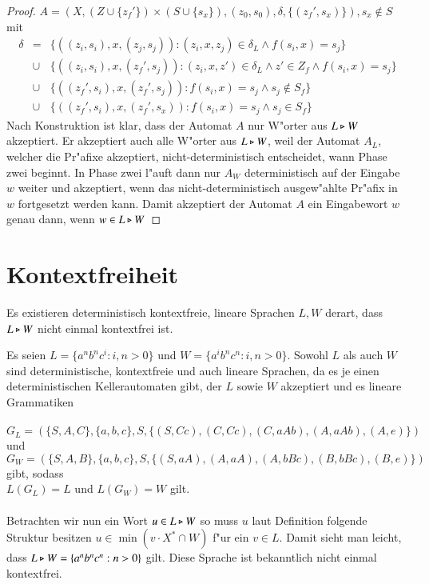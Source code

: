 \begin{proof}
$A = (X,(Z\cup \{ z_f'\})\times (S\cup \{ s_x\}), (z_{0},s_{0}), \delta , \{ (z_f',s_x) \} ), s_x\notin S$
mit\\
\setcounter{equation}{0}
\begin{eqnarray}
 \delta &=&\{ ((z_i,s_i),x,(z_j,s_j)) : (z_i,x,z_j) \in \delta_L \wedge f(s_i,x)=s_j  \}  \label{auto1} \\
 & \cup & \{ ((z_i,s_i),x,(z_f',s_j)) : (z_i,x,z') \in \delta_L \wedge z'\in Z_f \wedge f(s_i,x)=s_j  \} \label{auto2}\\
 & \cup & \{ ((z_f',s_i),x,(z_f',s_j)) : f(s_i,x)=s_j  \wedge s_j \notin S_f\} \label{auto3}\\
 & \cup & \{ ((z_f',s_i),x,(z_f',s_x)) : f(s_i,x)=s_j  \wedge s_j \in S_f \label{auto4} \}
\end{eqnarray}
Nach Konstruktion ist klar, dass der Automat $A$ nur W"orter aus $L\triangleright W$ akzeptiert. Er akzeptiert auch alle W"orter aus $L\triangleright W$, weil der Automat $A_L$, welcher die Pr"afixe akzeptiert, nicht-deterministisch entscheidet, wann Phase zwei beginnt. In Phase zwei l"auft dann nur $A_W$ deterministisch auf der Eingabe $w$ weiter und akzeptiert, wenn das nicht-deterministisch ausgew"ahlte Pr"afix in $w$ fortgesetzt werden kann.
Damit akzeptiert der Automat $A$ ein Eingabewort $w$ genau dann, wenn $w\in L\triangleright W$
\end{proof}

\section{Kontextfreiheit}
Es existieren deterministisch kontextfreie, lineare Sprachen $L,W$ derart, dass $L\triangleright W$ nicht einmal kontextfrei ist.
\begin{beispiel}
Es seien $L=\{a^nb^nc^i:i,n>0\}$ und $W=\{a^ib^nc^n:i,n>0\}$. Sowohl $L$ als auch $W$ sind deterministische, kontextfreie und auch lineare Sprachen, da es je einen deterministischen Kellerautomaten gibt, der $L$ sowie $W$ akzeptiert und es lineare Grammatiken \\\\$G_L = (\{S,A,C\},\{a,b,c\},S,\{ (S,Cc),(C,Cc),(C,aAb),(A,aAb),(A,e)\})$ und \\$G_W = (\{S,A,B\},\{a,b,c\},S,\{ (S,aA),(A,aA),(A,bBc),(B,bBc),(B,e) \})$ gibt, sodass \\$L(G_L) = L$ und $L(G_W) = W$ gilt.\\\\
Betrachten wir nun ein Wort $u\in L\triangleright W$ so muss $u$ laut Definition folgende Struktur besitzen $u\in \min( v\cdot X^* \cap W)$ f"ur ein $v \in L$.
Damit sieht man leicht, dass $L\triangleright W= \{a^nb^nc^n:n>0\}$ gilt. Diese Sprache ist bekanntlich nicht einmal kontextfrei.
\end{beispiel}


